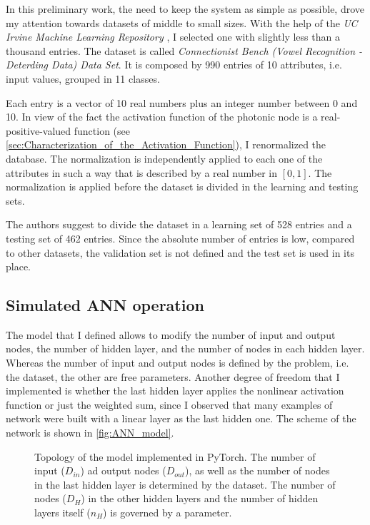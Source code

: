 In this preliminary work, the need to keep the system as simple as possible, drove my attention towards datasets of middle to small sizes.
With the help of the \textit{UC Irvine Machine Learning Repository} \cite{UCIMLR}, I selected one with slightly less than a thousand entries.
The dataset is called \textit{Connectionist Bench (Vowel Recognition - Deterding Data) Data Set}.
It is composed by \num{990} entries of \num{10} attributes, i.e. input values, grouped in \num{11} classes.

Each entry is a vector of \num{10} real numbers plus an integer number between \num{0} and \num{10}.
In view of the fact the activation function of the photonic node is a real-positive-valued function (see \autoref{sec:Characterization_of_the_Activation_Function}), I renormalized the database.
The normalization is independently applied to each one of the attributes in such a way that is described by a real number in $[0,1]$.
The normalization is applied before the dataset is divided in the learning and testing sets.

The authors suggest to divide the dataset in a learning set of \num{528} entries and a testing set of \num{462} entries.
Since the absolute number of entries is low, compared to other datasets, the validation set is not defined and the test set is used in its place.

\subsection{Simulated ANN operation}
\label{ssec:Simulated_ANN_operation}
The model that I defined allows to modify the number of input and output nodes, the number of hidden layer, and the number of nodes in each hidden layer.
Whereas the number of input and output nodes is defined by the problem, i.e. the dataset, the other are free parameters.
Another degree of freedom that I implemented is whether the last hidden layer applies the nonlinear activation function or just the weighted sum, since I observed that many examples of network were built with a linear layer as the last hidden one.
The scheme of the network is shown in \autoref{fig:ANN_model}.

\begin{figure}[htbp]
	\centering
	
	\caption{Topology of the model implemented in PyTorch. The number of input ($D_{in}$) ad output nodes ($D_{out}$), as well as the number of nodes in the last hidden layer is determined by the dataset.
	The number of nodes ($D_{H}$) in the other hidden layers and the number of hidden layers itself ($n_{H}$) is governed by a parameter.}
	\label{fig:ANN_model}
\end{figure}

